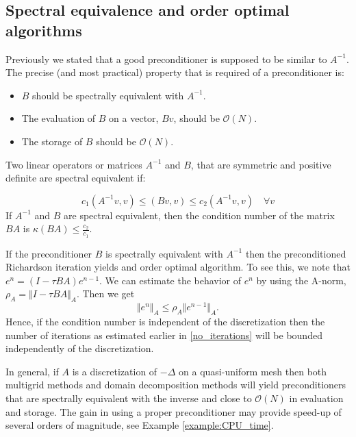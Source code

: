 \subsection{Spectral equivalence and order optimal algorithms} 

Previously we stated that a good preconditioner is supposed to be similar to $A^{-1}$. 
The precise (and most practical) property that is required of a preconditioner
is: 
\begin{itemize}
\item
  $B$ should be spectrally equivalent with $A^{-1}$.
\item
  The evaluation of $B$ on a vector, $Bv$, should be $\mathcal{O}(N)$.
\item
  The storage of $B$ should be $\mathcal{O}(N)$.
\end{itemize}



\begin{definition}Two linear operators or matrices $A^{-1}$ and $B$, that are symmetric 
and positive definite are spectral equivalent if:

\begin{equation}\label{eq:spectral_equivalence}%
c_1(A^{-1}v,v) \leqslant (Bv,v) \leqslant c_2(A^{-1}v,v) \quad \forall v
\end{equation}
If $A^{-1}$ and $B$ are spectral equivalent, then the condition number 
of the matrix $BA$ is $\kappa(BA) \leqslant \frac{c_2}{c_1}$.
\end{definition}

If the preconditioner $B$ is spectrally equivalent with $A^{-1}$ 
then the preconditioned  Richardson iteration yields 
and order optimal algorithm.  
To see this, we note that $e^n = (I-\tau BA)e^{n-1}$. We can estimate 
the behavior of $e^n$ by using the A-norm, $\rho_A = \Vert I - \tau BA\Vert_A$. 
Then we get
\[
\Vert e^n\Vert_A \leqslant \rho _A \Vert e^{n-1}\Vert_A.
\]
Hence, if the condition number is independent of the discretization 
then the number of iterations  as estimated earlier in \eqref{no_iterations} 
will be bounded independently of the discretization.  

In general, if $A$ is a discretization of $-\Delta$ on a quasi-uniform mesh  
then both multigrid methods and domain decomposition methods will yield 
preconditioners that are spectrally equivalent with the inverse and close 
to $\mathcal{O}(N)$ in evaluation and storage.  
The gain in using a proper preconditioner may provide speed-up of several
orders of magnitude, see Example \ref{example:CPU_time}.  









